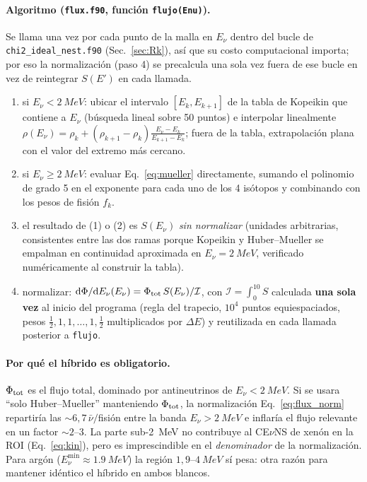 \documentclass[11pt,a4paper]{article}
\newcommand{\Enu}{E_{\nu}}
\newcommand{\code}[1]{\texttt{#1}}
\newcommand{\dd}{\mathrm{d}}
\begin{document}
\paragraph{Algoritmo (\code{flux.f90}, funci\'on \code{flujo(Enu)}).} Se llama una
vez por cada punto de la malla en $\Enu$ dentro del bucle de \code{chi2\_ideal\_nest.f90}
(Sec.~\ref{sec:Rk}), as\'i que su costo computacional importa; por eso la
normalizaci\'on (paso 4) se precalcula una sola vez fuera de ese bucle en vez de
reintegrar $S(E')$ en cada llamada.
\begin{enumerate}\itemsep2pt
  \item si $\Enu<\SI{2}{MeV}$: ubicar el intervalo $[E_{k},E_{k+1}]$ de la tabla
    de Kopeikin que contiene a $\Enu$ (b\'usqueda lineal sobre 50 puntos) e
    interpolar linealmente $\rho(\Enu)=\rho_{k}+(\rho_{k+1}-\rho_{k})
    \tfrac{\Enu-E_{k}}{E_{k+1}-E_{k}}$; fuera de la tabla, extrapolaci\'on plana
    con el valor del extremo m\'as cercano.
  \item si $\Enu\ge\SI{2}{MeV}$: evaluar Eq.~\eqref{eq:mueller} directamente,
    sumando el polinomio de grado 5 en el exponente para cada uno de los 4
    is\'otopos y combinando con los pesos de fisi\'on $f_{k}$.
  \item el resultado de (1) o (2) es $S(\Enu)$ \emph{sin normalizar} (unidades
    arbitrarias, consistentes entre las dos ramas porque Kopeikin y
    Huber--Mueller se empalman en continuidad aproximada en $\Enu=\SI{2}{MeV}$,
    verificado num\'ericamente al construir la tabla).
  \item normalizar: $\dd\Phi/\dd\Enu(\Enu) = \Phi_{\rm tot}\,S(\Enu)/\mathcal{I}$,
    con $\mathcal{I}=\int_{0}^{10}S$ calculada \textbf{una sola vez} al inicio del
    programa (regla del trapecio, $10^{4}$ puntos equiespaciados, pesos
    $\tfrac12,1,1,\ldots,1,\tfrac12$ multiplicados por $\Delta E$) y reutilizada
    en cada llamada posterior a \code{flujo}.
\end{enumerate}

\paragraph{Por qu\'e el h\'ibrido es obligatorio.} $\Phi_{\rm tot}$ es el flujo
total, dominado por antineutrinos de $\Enu<\SI{2}{MeV}$. Si se usara ``solo
Huber--Mueller'' manteniendo $\Phi_{\rm tot}$, la normalizaci\'on
Eq.~\eqref{eq:flux_norm} repartir\'ia las $\sim 6{,}7\,\bar\nu/$fisi\'on entre la
banda $\Enu>\SI{2}{MeV}$ e inflar\'ia el flujo relevante en un factor
$\sim 2$--$3$. La parte sub-\SI{2}{MeV} no contribuye al CE$\nu$NS de xen\'on en
la ROI (Eq.~\eqref{eq:kin}), pero es imprescindible en el \emph{denominador} de
la normalizaci\'on. Para arg\'on ($\Enu^{\min}\approx\SI{1.9}{MeV}$) la regi\'on
$1{,}9$--$\SI{4}{MeV}$ s\'i pesa: otra raz\'on para mantener id\'entico el
h\'ibrido en ambos blancos.
\end{document}
